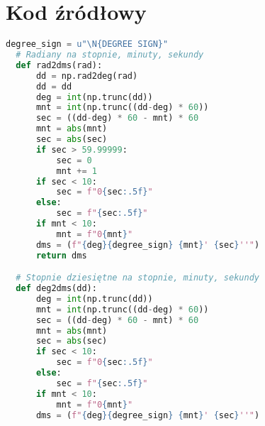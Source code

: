 \documentclass[fleqn,10pt,a4paper]{article}
\begin{document}
\newpage 
\section{Kod źródłowy}

\begin{lstlisting}[language=Python, caption=Zamiany jednostek kątowych, label = kod:katy, style = mycode]
  degree_sign = u"\N{DEGREE SIGN}"
  # Radiany na stopnie, minuty, sekundy
  def rad2dms(rad):
      dd = np.rad2deg(rad)
      dd = dd
      deg = int(np.trunc(dd))
      mnt = int(np.trunc((dd-deg) * 60))
      sec = ((dd-deg) * 60 - mnt) * 60
      mnt = abs(mnt)
      sec = abs(sec)
      if sec > 59.99999:
          sec = 0
          mnt += 1
      if sec < 10:
          sec = f"0{sec:.5f}"
      else:
          sec = f"{sec:.5f}"
      if mnt < 10:
          mnt = f"0{mnt}"
      dms = (f"{deg}{degree_sign} {mnt}' {sec}''")
      return dms

  # Stopnie dziesiętne na stopnie, minuty, sekundy
  def deg2dms(dd):
      deg = int(np.trunc(dd))
      mnt = int(np.trunc((dd-deg) * 60))
      sec = ((dd-deg) * 60 - mnt) * 60
      mnt = abs(mnt)
      sec = abs(sec)
      if sec < 10:
          sec = f"0{sec:.5f}"
      else:
          sec = f"{sec:.5f}"
      if mnt < 10:
          mnt = f"0{mnt}"
      dms = (f"{deg}{degree_sign} {mnt}' {sec}''")
\end{lstlisting}
\newpage
\end{document}
